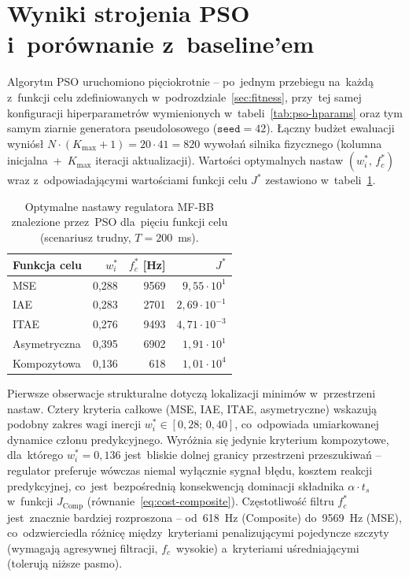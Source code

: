 \section{Wyniki strojenia PSO i~porównanie z~baseline'em}
\label{sec:wyniki-pso}

Algorytm PSO uruchomiono pięciokrotnie -- po~jednym przebiegu na~każdą z~funkcji celu zdefiniowanych w~podrozdziale~\ref{sec:fitness}, przy~tej samej konfiguracji hiperparametrów wymienionych w~tabeli~\ref{tab:pso-hparams} oraz tym samym ziarnie generatora pseudolosowego ($\texttt{seed}=42$). Łączny budżet ewaluacji wyniósł $N\cdot(K_{\max}+1) = 20\cdot 41 = 820$ wywołań silnika fizycznego (kolumna inicjalna~+~$K_{\max}$ iteracji aktualizacji). Wartości optymalnych nastaw $(w_i^*,\,f_c^*)$ wraz z~odpowiadającymi wartościami funkcji celu $J^*$ zestawiono w~tabeli~\ref{tab:pso-wyniki}.

\begin{table}[h!]
    \centering
    \caption{Optymalne nastawy regulatora MF-BB znalezione przez~PSO dla~pięciu funkcji celu (scenariusz trudny, $T = 200$~ms).}
    \label{tab:pso-wyniki}
    \begin{tabular}{lrrr}
        \toprule
        \textbf{Funkcja celu} & $w_i^*$ & $f_c^*$ [Hz] & $J^*$ \\
        \midrule
        MSE        & 0{,}288 & 9569 & $9{,}55\cdot 10^{1}$ \\
        IAE        & 0{,}283 & 2701 & $2{,}69\cdot 10^{-1}$ \\
        ITAE       & 0{,}276 & 9493 & $4{,}71\cdot 10^{-3}$ \\
        Asymetryczna & 0{,}395 & 6902 & $1{,}91\cdot 10^{1}$ \\
        Kompozytowa & 0{,}136 & \phantom{0}618 & $1{,}01\cdot 10^{4}$ \\
        \bottomrule
    \end{tabular}
\end{table}

Pierwsze obserwacje strukturalne dotyczą lokalizacji minimów w~przestrzeni nastaw. Cztery kryteria całkowe (MSE, IAE, ITAE, asymetryczne) wskazują podobny zakres wagi inercji $w_i^* \in [0{,}28;\,0{,}40]$, co~odpowiada umiarkowanej dynamice członu predykcyjnego. Wyróżnia się jedynie kryterium kompozytowe, dla~którego $w_i^* = 0{,}136$ jest~bliskie dolnej granicy przestrzeni przeszukiwań -- regulator preferuje wówczas niemal wyłącznie sygnał błędu, kosztem reakcji predykcyjnej, co~jest~bezpośrednią konsekwencją dominacji składnika $\alpha\cdot t_s$ w~funkcji $J_{\mathrm{Comp}}$ (równanie~\eqref{eq:cost-composite}). Częstotliwość filtru $f_c^*$ jest~znacznie bardziej rozproszona -- od~618~Hz (Composite) do~9569~Hz (MSE), co~odzwierciedla różnicę między~kryteriami penalizującymi pojedyncze szczyty (wymagają agresywnej filtracji, $f_c$~wysokie) a~kryteriami uśredniającymi (tolerują niższe pasmo).

